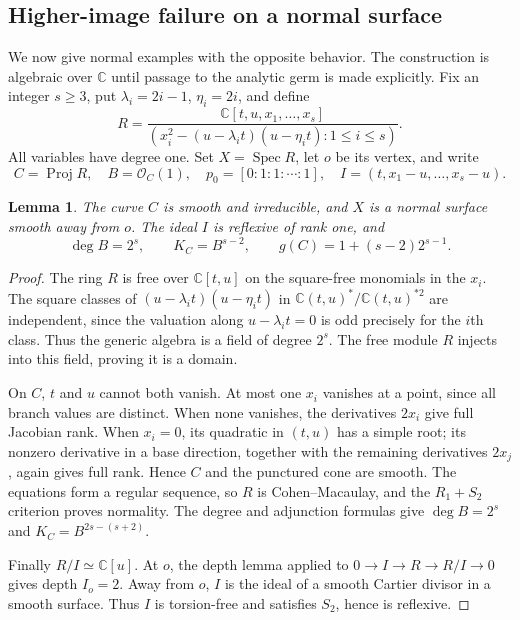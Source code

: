 \documentclass[11pt,reqno]{amsart}
\numberwithin{equation}{section}
\newtheorem{lemma}[theorem]{Lemma}
\theoremstyle{definition}
\theoremstyle{remark}
\newcommand{\OO}{\mathcal O}
\newcommand{\CC}{\mathbb C}
\DeclareMathOperator{\Proj}{Proj}
\begin{document}
\subsection{Higher-image failure on a normal surface}
We now give normal examples with the opposite behavior. The construction is algebraic over $\CC$ until passage to the analytic germ is made explicitly. Fix an integer $s\geq3$, put $\lambda_i=2i-1$, $\eta_i=2i$, and define
\begin{equation}\label{eq:cone-ring}
 R=\frac{\CC[t,u,x_1,\ldots,x_s]}
 {(x_i^2-(u-\lambda_it)(u-\eta_it):1\leq i\leq s)}.
\end{equation}
All variables have degree one. Set $X=\operatorname{Spec}R$, let $o$ be its vertex, and write
\[
 C=\Proj R,\quad B=\OO_C(1),\quad
 p_0=[0:1:1:\cdots:1],\quad I=(t,x_1-u,\ldots,x_s-u).
\]
\begin{lemma}\label{lem:cone}
The curve $C$ is smooth and irreducible, and $X$ is a normal surface smooth away from $o$. The ideal $I$ is reflexive of rank one, and
\[
 \deg B=2^s,\qquad K_C=B^{s-2},\qquad
 g(C)=1+(s-2)2^{s-1}.
\]
\end{lemma}
\begin{proof}
The ring $R$ is free over $\CC[t,u]$ on the square-free monomials in the $x_i$. The square classes of $(u-\lambda_it)(u-\eta_it)$ in $\CC(t,u)^*/\CC(t,u)^{*2}$ are independent, since the valuation along $u-\lambda_it=0$ is odd precisely for the $i$th class. Thus the generic algebra is a field of degree $2^s$. The free module $R$ injects into this field, proving it is a domain.

On $C$, $t$ and $u$ cannot both vanish. At most one $x_i$ vanishes at a point, since all branch values are distinct. When none vanishes, the derivatives $2x_i$ give full Jacobian rank. When $x_i=0$, its quadratic in $(t,u)$ has a simple root; its nonzero derivative in a base direction, together with the remaining derivatives $2x_j$, again gives full rank. Hence $C$ and the punctured cone are smooth. The equations form a regular sequence, so $R$ is Cohen--Macaulay, and the $R_1+S_2$ criterion proves normality. The degree and adjunction formulas give $\deg B=2^s$ and $K_C=B^{2s-(s+2)}$.

Finally $R/I\simeq\CC[u]$. At $o$, the depth lemma applied to $0\to I\to R\to R/I\to0$ gives depth $I_o=2$. Away from $o$, $I$ is the ideal of a smooth Cartier divisor in a smooth surface. Thus $I$ is torsion-free and satisfies $S_2$, hence is reflexive.
\end{proof}
\end{document}
